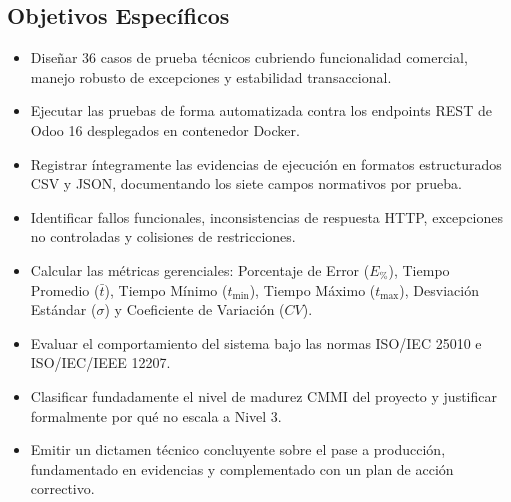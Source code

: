 \documentclass{article}
\begin{document}
\subsection{Objetivos Específicos}
\begin{itemize}[leftmargin=*]
\item Diseñar 36 casos de prueba técnicos cubriendo funcionalidad comercial, manejo robusto de excepciones y estabilidad transaccional.
\item Ejecutar las pruebas de forma automatizada contra los endpoints REST de Odoo 16 desplegados en contenedor Docker.
\item Registrar íntegramente las evidencias de ejecución en formatos estructurados CSV y JSON, documentando los siete campos normativos por prueba.
\item Identificar fallos funcionales, inconsistencias de respuesta HTTP, excepciones no controladas y colisiones de restricciones.
\item Calcular las métricas gerenciales: Porcentaje de Error ($E_{\%}$), Tiempo Promedio ($\bar{t}$), Tiempo Mínimo ($t_{\min}$), Tiempo Máximo ($t_{\max}$), Desviación Estándar ($\sigma$) y Coeficiente de Variación ($CV$).
\item Evaluar el comportamiento del sistema bajo las normas ISO/IEC 25010 e ISO/IEC/IEEE 12207.
\item Clasificar fundadamente el nivel de madurez CMMI del proyecto y justificar formalmente por qué no escala a Nivel 3.
\item Emitir un dictamen técnico concluyente sobre el pase a producción, fundamentado en evidencias y complementado con un plan de acción correctivo.
\end{itemize}
\end{document}
